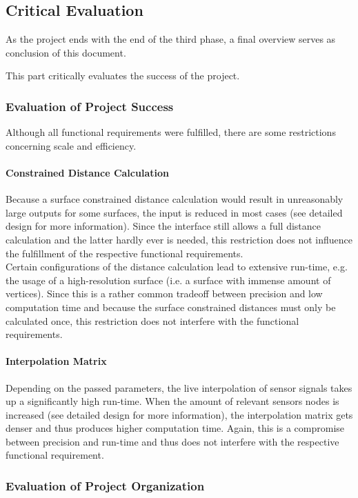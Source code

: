 \subsection{Critical Evaluation}
As the project ends with the end of the third phase, a final overview serves as conclusion of this document.

This part critically evaluates the success of the project.

\subsubsection{Evaluation of Project Success}
Although all functional requirements were fulfilled, there are some restrictions concerning scale and efficiency.

\paragraph{Constrained Distance Calculation}
Because a surface constrained distance calculation would result in unreasonably large outputs for some surfaces, the input is reduced in most cases (see detailed design for more information). Since the interface still allows a full distance calculation and the latter hardly ever is needed, this restriction does not influence the fulfillment of the respective functional requirements.\\
Certain configurations of the distance calculation lead to extensive run-time, e.g. the usage of a high-resolution surface (i.e. a surface with immense amount of vertices). Since this is a rather common tradeoff between precision and low computation time and because the surface constrained distances must only be calculated once, this restriction does not interfere with the functional requirements.

\paragraph{Interpolation Matrix}
Depending on the passed parameters, the live interpolation of sensor signals takes up a significantly high run-time. When the amount of relevant sensors nodes is increased (see detailed design for more information), the interpolation matrix gets denser and thus produces higher computation time. Again, this is a compromise between precision and run-time and thus does not interfere with the respective functional requirement.

\subsubsection{Evaluation of Project Organization}

